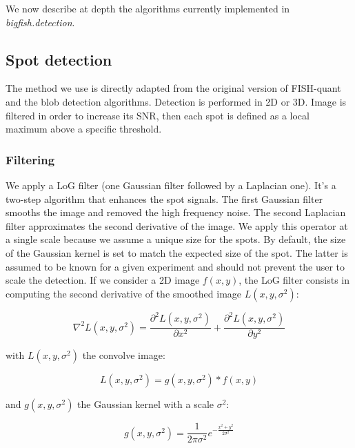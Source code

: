 We now describe at depth the algorithms currently implemented in \emph{bigfish.detection}.

\subsection{Spot detection}
\label{subsec:spot_detection}

The method we use is directly adapted from the original version of FISH-quant\cite{mueller_fish-quant_2013} and the blob detection algorithms\cite{walt_scikit-image_2014}.
Detection is performed in 2D or 3D. Image is filtered in order to increase its \ac{SNR}, then each spot is defined as a local maximum above a specific threshold.

\subsubsection{Filtering}

We apply a \ac{LoG} filter (one Gaussian filter followed by a Laplacian one).
It's a two-step algorithm that enhances the spot signals.
The first Gaussian filter smooths the image and removed the high frequency noise.
The second Laplacian filter approximates the second derivative of the image.
We apply this operator at a single scale because we assume a unique size for the spots.
By default, the size of the Gaussian kernel is set to match the expected size of the spot.
The latter is assumed to be known for a given experiment and should not prevent the user to scale the detection.
If we consider a 2D image $f(x,y)$, the \ac{LoG} filter consists in computing the second derivative of the smoothed image $L(x, y, \sigma^2)$:

\begin{equation}
	{\displaystyle \nabla^{2}L(x, y, \sigma^2) = \frac{\partial^{2}L(x, y, \sigma^2)}{\partial x^2} + \frac{\partial^{2}L(x, y, \sigma^2)}{\partial y^2}}
\end{equation}

\noindent
with $L(x, y, \sigma^2)$ the convolve image:

\begin{equation}
	{\displaystyle L(x, y, \sigma^2) = g(x, y, \sigma^2) * f(x, y)}
\end{equation}

\noindent
and $g(x, y, \sigma^2)$ the Gaussian kernel with a scale $\sigma^2$:

\begin{equation}
	{\displaystyle g(x, y, \sigma^2) = \frac{1}{2\pi \sigma^2} e^{-{\frac{x^{2} + y^{2}}{2\sigma^2}}}}
\end{equation}

